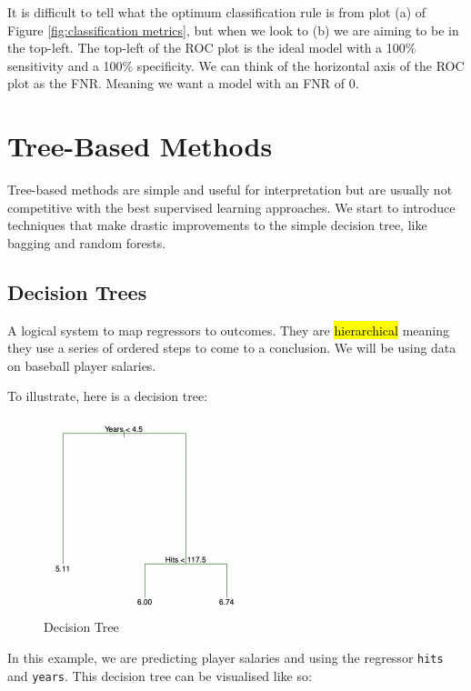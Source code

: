 \documentclass[11pt]{article}
\begin{document}
It is difficult to tell what the optimum classification rule is from plot (a) of Figure \ref{fig:classification metrics}, but when we look to (b) we are aiming to be in the top-left. The top-left of the ROC plot is the ideal model with a 100\% sensitivity and a 100\% specificity. We can think of the horizontal axis of the ROC plot as the FNR. Meaning we want a model with an FNR of 0. 

\newpage

\section{Tree-Based Methods}

Tree-based methods are simple and useful for interpretation but are usually not competitive with the best supervised learning approaches. We start to introduce techniques that make drastic improvements to the simple decision tree, like bagging and random forests.


\subsection{Decision Trees}

A logical system to map regressors to outcomes. They are \hl{hierarchical} meaning they use a series of ordered steps to come to a conclusion. We will be using data on baseball player salaries.

To illustrate, here is a decision tree:

\begin{figure}[h]
    \centering
    \includegraphics[width=6cm]{pic/decision tree.png}
    \caption{Decision Tree}
    \label{fig:decision tree}
\end{figure}

In this example, we are predicting player salaries and using the regressor \lstinline{hits} and \lstinline{years}. This decision tree can be visualised like so:
\end{document}
